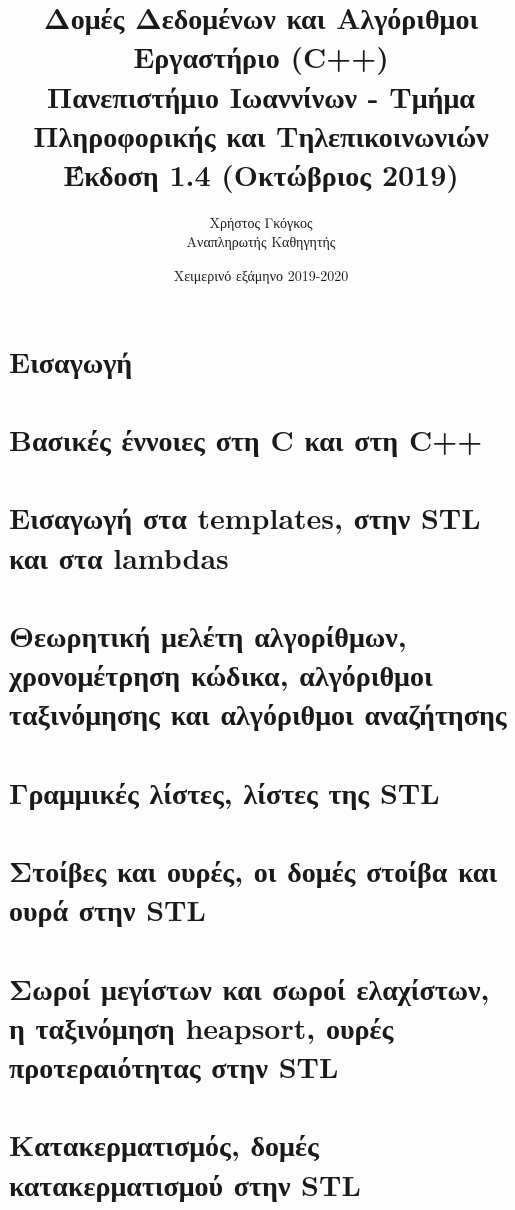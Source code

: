 \documentclass[11pt,a4paper,twoside,openany]{book}
\title{Δομές Δεδομένων και Αλγόριθμοι \\ Εργαστήριο (C++)\\ Πανεπιστήμιο Ιωαννίνων - Τμήμα Πληροφορικής και Τηλεπικοινωνιών \\ Έκδοση 1.4 (Οκτώβριος 2019)}
\author{Χρήστος Γκόγκος  \\ Αναπληρωτής Καθηγητής }
\date{Χειμερινό εξάμηνο 2019-2020}
\begin{document}
\frontmatter
\maketitle
\tableofcontents
\mainmatter

\chapter*{Εισαγωγή}


\chapter{Βασικές έννοιες στη C και στη C++}


\chapter{Εισαγωγή στα templates, στην STL και στα lambdas}


\chapter{Θεωρητική μελέτη αλγορίθμων, χρονομέτρηση κώδικα, αλγόριθμοι ταξινόμησης και αλγόριθμοι αναζήτησης}


\chapter{Γραμμικές λίστες, λίστες της STL}


\chapter{Στοίβες και ουρές, οι δομές στοίβα και ουρά στην STL}


\chapter{Σωροί μεγίστων και σωροί ελαχίστων, η ταξινόμηση heapsort, ουρές προτεραιότητας στην STL}


\chapter{Κατακερματισμός, δομές κατακερματισμού στην STL}

\end{document}
